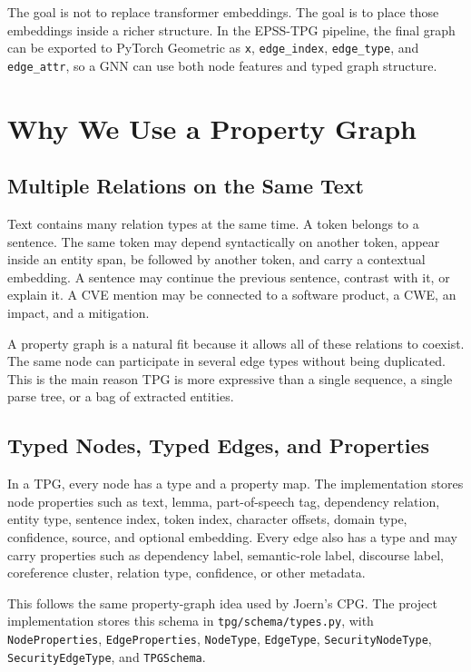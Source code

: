 \documentclass[11pt]{article}
\begin{document}
The goal is not to replace transformer embeddings. The goal is to place those
embeddings inside a richer structure. In the EPSS-TPG pipeline, the final graph
can be exported to PyTorch Geometric as \texttt{x}, \texttt{edge\_index},
\texttt{edge\_type}, and \texttt{edge\_attr}, so a GNN can use both node
features and typed graph structure.

\section{Why We Use a Property Graph}

\subsection{Multiple Relations on the Same Text}

Text contains many relation types at the same time. A token belongs to a
sentence. The same token may depend syntactically on another token, appear
inside an entity span, be followed by another token, and carry a contextual
embedding. A sentence may continue the previous sentence, contrast with it, or
explain it. A CVE mention may be connected to a software product, a CWE, an
impact, and a mitigation.

A property graph is a natural fit because it allows all of these relations to
coexist. The same node can participate in several edge types without being
duplicated. This is the main reason TPG is more expressive than a single
sequence, a single parse tree, or a bag of extracted entities.

\subsection{Typed Nodes, Typed Edges, and Properties}

In a TPG, every node has a type and a property map. The implementation stores
node properties such as text, lemma, part-of-speech tag, dependency relation,
entity type, sentence index, token index, character offsets, domain type,
confidence, source, and optional embedding. Every edge also has a type and may
carry properties such as dependency label, semantic-role label, discourse
label, coreference cluster, relation type, confidence, or other metadata.

This follows the same property-graph idea used by Joern's CPG. The project
implementation stores this schema in \texttt{tpg/schema/types.py}, with
\texttt{NodeProperties}, \texttt{EdgeProperties}, \texttt{NodeType},
\texttt{EdgeType}, \texttt{SecurityNodeType}, \texttt{SecurityEdgeType}, and
\texttt{TPGSchema}.
\end{document}
